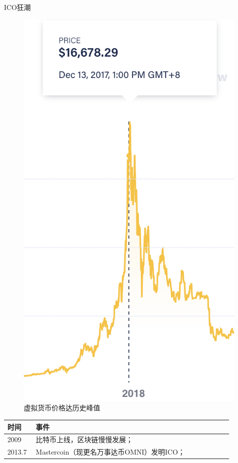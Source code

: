 \documentclass[11pt]{beamer}
\begin{document}
\begin{frame}{ICO狂潮}
	\begin{minipage}[t]{0.4\linewidth}
		\begin{figure}
			\centering
			\includegraphics[width=0.7\linewidth,height=0.7\textheight]{figures/94btcprice}
			\caption{\footnotesize 虚拟货币价格达历史峰值}
		\end{figure}
	\end{minipage}%
	\begin{minipage}[t]{0.6\linewidth}
		\begin{table}[]
			\footnotesize
			\begin{tabular}{@{}p{0.1\linewidth}p{0.8\linewidth}@{}}
				\toprule
				时间     & 事件                                                                                       \\ \midrule
				2009     & 比特币上线，区块链慢慢发展；                                                               \\
				2013.7   & Mastercoin（现更名万事达币OMNI）发明ICO；                                                  \\

\end{tabular}
\end{table}
\end{minipage}
\end{frame}
\end{document}
